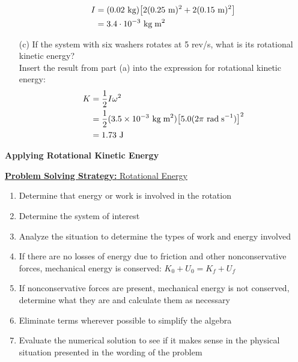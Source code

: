 \documentclass[a4paper]{article}
\let\bf\textbf
\newcommand\rads{\text{ rad\;s}^{-1}}
\newcommand\m{\text{ m}}
\newcommand\J{\text{ J}}
\newcommand\kg{\text{ kg}}
\newcommand\kgmm{\text{ kg\;m}^{2}}
\begin{document}
\begin{shaded}
\begin{enumerate}
        \begin{align*}
            I &= (0.02\kg)\big[2(0.25\m)^2 + 2(0.15\m)^2\big]\\
            &= 3.4 \cdot 10^{-3}\kgmm
        \end{align*}
        \item[(c)] If the system with six washers rotates at 5 rev/s, what is its rotational kinetic energy?
        \vspace{1mm}\\
        Insert the result from part (a) into the expression for rotational kinetic energy:
        \begin{align*}
            K &= \frac{1}{2}I\omega^2\\
            &= \frac{1}{2}(3.5 \times 10^{-3}\kgmm)\big[5.0(2\pi\rads)\big]^2\\
            &= 1.73\J
        \end{align*}
    \end{enumerate}
\end{shaded}
\newpage
\noindent\bf{Applying Rotational Kinetic Energy}
\begin{shaded}
    \underline{\bf{Problem Solving Strategy:} Rotational Energy}
    \begin{enumerate}
        \item Determine that energy or work is involved in the rotation
        \item Determine the system of interest
        \item Analyze the situation to determine the types of work and energy involved
        \item If there are no losses of energy due to friction and other nonconservative forces, mechanical energy is conserved: $K_0 + U_0 = K_f + U_f$
        \item If nonconservative forces are present, mechanical energy is not conserved, determine what they are and calculate them as necessary
        \item Eliminate terms wherever possible to simplify the algebra
        \item Evaluate the numerical solution to see if it makes sense in the physical situation presented in the wording of the problem
    \end{enumerate}
\end{shaded}
\end{document}
